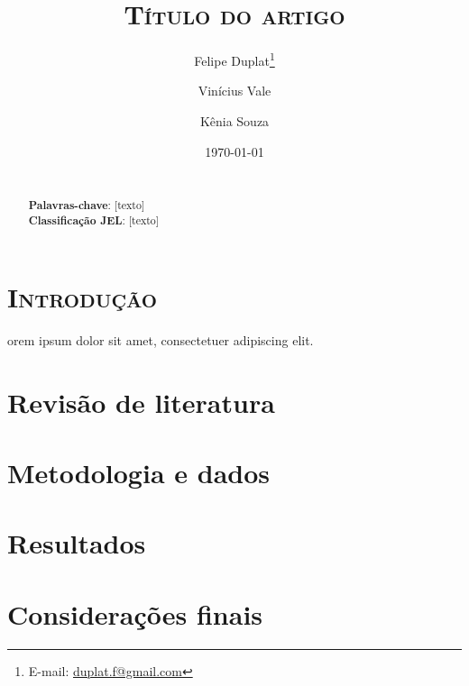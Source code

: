 \documentclass[a4paper, 11pt]{article}
\title{\textsc{Título do artigo}}
\author[$\Psi$]{Felipe Duplat\thanks{E-mail: \href{mailto:duplat.f@gmail.com}{duplat.f@gmail.com}}}
\author[$\Psi$]{Vinícius Vale}
\author[$\Psi$]{Kênia Souza}
\affil[$\Psi$]{\footnotesize Universidade Federal do Paraná, Brasil}
\date{\today}
\begin{document}
\maketitle


\begin{abstract}
	\lipsum[1] \\
	\textbf{Palavras-chave}: [texto] \\
	\textbf{Classificação JEL}: [texto]
\end{abstract}


\vspace{0.5cm}



\begin{multicols}{2}

\section{\textsc{Introdução}}

\lettrine[lines=3,loversize=.6,lraise=.1,nindent=.5em]{}{} orem ipsum dolor sit amet, consectetuer adipiscing elit. \lipsum[1-4]



\section{Revisão de literatura}

\lipsum[1-7]



\section{Metodologia e dados}

\lipsum[1-4]



\section{Resultados}

\lipsum[1-5]



\section{Considerações finais}

\lipsum[1-6]



\printbibliography[title={Referências}]

\end{multicols}
\end{document}
